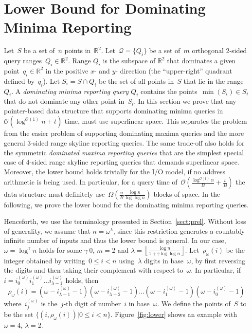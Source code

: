 \documentclass[]{article}
\newcommand{\bigO}{\mathcal{O}}
\begin{document}
\section{Lower Bound for Dominating Minima Reporting} \label{sec:dommaxlb} 


Let~$S$ be a set of~$n$ points in~$\mathbb{R}^2$. Let~$\mathcal{Q} =\{Q_i\}$ be
a set of~$m$ orthogonal 2-sided query ranges~$Q_i \in \mathbb{R}^2$. Range $Q_i$
is the subspace of $\mathbb{R}^2$ that dominates a given point~$q_i\in
\mathbb{R}^2$ in the positive $x$- and $y$- direction (the ``upper-right''
quadrant defined by~$q_i$). Let $S_i=S \cap Q_i$ be the set of all points in~$S$
that lie in the range~$Q_i$. A \textit{dominating minima reporting query} $Q_i$
contains the points~$\min(S_i) \in S_i$ that do not dominate any other point
in~$S_i$. In this section we prove that any pointer-based data structure that
supports dominating minima queries in~$\bigO(\log^{\bigO(1)}{n}+t)$ time, must
use superlinear space. This separates the problem from the easier problem of
supporting dominating maxima queries and the more general 3-sided range skyline
reporting queries. The same trade-off also holds for the symmetric
\textit{dominated maxima reporting queries} that are the simplest special case
of 4-sided range skyline reporting queries that demands superlinear space.
Moreover, the lower bound holds trivially for the I/O model, if no address
arithmetic is being used. In particular, for a query time of~$\bigO
(\frac{\log^{\bigO(1)}{n}}{B}+\frac{t}{B})$ the data structure must definitely
use~$\Omega (\frac{n}{B}\frac{\log{n}}{\log{\log{n}}})$ blocks of space. In the
following, we prove the lower bound for the dominating minima reporting queries.

Henceforth, we use the terminology presented in Section~\ref{sect:prel}. Without
loss of generality, we assume that $n = \omega^\lambda$, since this
restriction generates a countably infinite number of inputs and thus the lower
bound is general. In our case, $\omega =\log^\gamma{n}$ holds for some
$\gamma \> 0$, $m=2$ and $\lambda=\left\lfloor
\frac{\log{n}}{1+\gamma\log{\log{n}}}\right \rfloor$. Let~$\rho_{\omega}(i)$ be
the integer obtained by writing~$0\leq i <n$ using~$\lambda$
digits in base~$\omega$, by first reversing the digits and then taking their
complement with respect to~$\omega$. In particular, if~$i=i^{(\omega)}_0
i^{(\omega)}_1 \ldots i^{(\omega)}_{\lambda-1}$ holds, then
\[
  \rho_{\omega}(i)
  =
  (\omega-i^{(\omega)}_{\lambda-1}-1)(\omega-i^{(\omega)}_{\lambda-2}-1)\ldots
  (\omega-i^{(\omega)}_1-1)(\omega-i^{(\omega)}_0-1)
\]
where~$i^{(\omega)}_j$ is the~$j$-th digit of number~$i$ in base~$\omega$. We
define the points of~$S$ to be the set $\{(i,\rho_{\omega}(i))| 0 \leq i <n\}$.
Figure~\ref{fig:lower} shows an example with $\omega=4$, $\lambda=2$.
\end{document}
